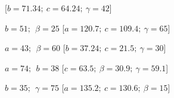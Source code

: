 \begin{esercizio}
\begin{enumeratea}
   \hfill [\(b=71.34;~c=64.24;~\gamma=42\)]
  \item  \(b=51;~~\beta=25\)
   \hfill [\(a=120.7;~c=109.4;~\gamma=65\)]
  \item  \(a=43;~~\beta=60\)
   \hfill [\(b=37.24;~c=21.5;~\gamma=30\)]
  \item  \(a=74;~~b=38\)
   \hfill [\(c=63.5;~\beta=30.9;~\gamma=59.1\)]
  \item  \(b=35;~~\gamma=75\)
   \hfill [\(a=135.2;~c=130.6;~\beta=15\)]
 \end{enumeratea}
\end{esercizio}


% 
% 

